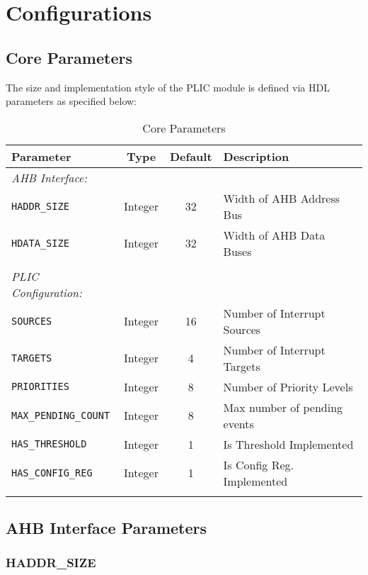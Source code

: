 \chapter{Configurations}

\hypertarget{core-parameters}{\section{Core Parameters}\label{sec:core-parameters}}

The size and implementation style of the PLIC module is defined via HDL parameters as specified below:

\begin{longtable}[c]{@{\extracolsep{\fill}}lccl@{}}	
	\toprule 
	\textbf{Parameter}           & \textbf{Type} & \textbf{Default} & \textbf{Description}\\
	\midrule
	\endhead
	\emph{AHB Interface:}\\
	\texttt{HADDR\_SIZE}         & Integer & 32 & Width of AHB Address Bus\\
	\texttt{HDATA\_SIZE}         & Integer & 32 & Width of AHB Data Buses\\
	& & & \\
	\emph{PLIC Configuration:}\\
	\texttt{SOURCES}             & Integer & 16 & Number of Interrupt Sources\\
	\texttt{TARGETS}             & Integer & 4 & Number of Interrupt Targets\\
	\texttt{PRIORITIES}          & Integer & 8 & Number of Priority Levels\\
	\texttt{MAX\_PENDING\_COUNT} & Integer & 8 & Max number of pending events\\
	\texttt{HAS\_THRESHOLD}      & Integer & 1 & Is Threshold Implemented\\
	\texttt{HAS\_CONFIG\_REG}    & Integer & 1 & Is Config Reg. Implemented\\
	\bottomrule 	
	\caption{Core Parameters}
	\label{tab:CoreParams}
\end{longtable}

\section{AHB Interface Parameters}

\subsection{HADDR\_SIZE}

